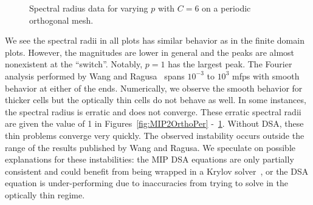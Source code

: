\documentclass[12pt,letterpaper]{article}
\begin{document}
\begin{figure}[!hbt]
\centering
{}
\caption{Spectral radius data for varying $p$ with $C=6$ on a periodic orthogonal mesh.}
\label{fig:MIP6OrthoPer}
\end{figure}

We see the spectral radii in all plots has similar behavior as in the finite domain plots. However, the magnitudes are lower in general and the peaks are almost nonexistent at the ``switch''. Notably, $p=1$ has the largest peak. The Fourier analysis performed by Wang and Ragusa~\cite{WangRagusaDSA} spans $10^{-3}$ to $10^3$ mfps with smooth behavior at either of the ends. Numerically, we observe the smooth behavior for thicker cells but the optically thin cells do not behave as well. In some instances, the spectral radius is erratic and does not converge. These erratic spectral radii are given the value of 1 in Figures~\ref{fig:MIP2OrthoPer} -~\ref{fig:MIP6OrthoPer}. Without DSA, these thin problems converge very quickly. The observed instability occurs outside the range of the results published by Wang and Ragusa. We speculate on possible explanations for these instabilities: the MIP DSA equations are only partially consistent and could benefit from being wrapped in a Krylov solver~\cite{WarsaKrylovDSA}, or the DSA equation is under-performing due to inaccuracies from trying to solve in the optically thin regime.
\end{document}
